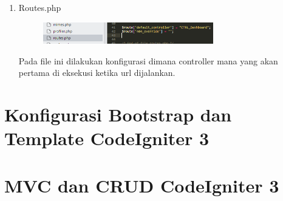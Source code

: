 \begin{enumerate}
	\item Routes.php
		\begin{figure}[!htbp]
    		\centering
    		\includegraphics[width=0.7\textwidth]{figures/CodeIgniter5.PNG}
    		\label{CodeIgniter5}
		\end{figure}
		\par Pada file ini dilakukan konfigurasi dimana controller mana yang akan pertama di eksekusi ketika url dijalankan.
\end{enumerate}

\section{Konfigurasi Bootstrap dan Template CodeIgniter 3}
\section{MVC dan CRUD CodeIgniter 3}